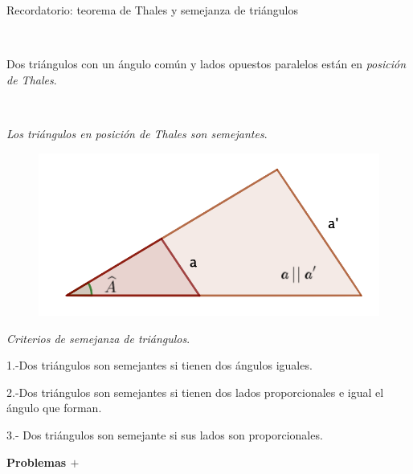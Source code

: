 \begin{myexampleblock}{Recordatorio: teorema de Thales y semejanza de triángulos}
\begin{multicols}{2}
$\quad$

Dos triángulos con un ángulo común y lados opuestos paralelos están en \emph{posición de Thales}.

$\quad$

\emph{Los triángulos en posición de Thales son semejantes}.
\begin{figure}[H]
	\centering
	\includegraphics[width=.45\textwidth]{img-rt/rt38.png}
\end{figure}	
\end{multicols}

\emph{Criterios de semejanza de triángulos}.

\vspace{1mm}
1.-Dos triángulos son semejantes si tienen dos ángulos iguales.

2.-Dos triángulos son semejantes si tienen dos lados proporcionales e igual el ángulo que forman.

3.- Dos triángulos son semejante si sus lados son proporcionales.
\end{myexampleblock}


\newpage

\vspace{1cm}
\begin{adjustwidth}{50pt}{250pt}
\begin{cuadro-naranja}
\textbf{\huge{Problemas $\boldsymbol{+}$}}\normalsize{$\, $}
\end{cuadro-naranja}	
\end{adjustwidth}

